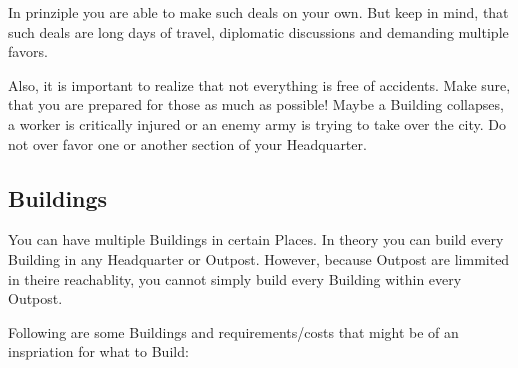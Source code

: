 \documentclass[10pt,twoside,twocolumn,openany]{book}
\begin{document}
In prinziple you are able to make such deals on your own. But keep in mind, that such deals are long days of travel, diplomatic discussions and demanding multiple favors.

Also, it is important to realize that not everything is free of accidents. Make sure, that you are prepared for those as much as possible! Maybe a Building collapses, a worker is critically injured or an enemy army is trying to take over the city. Do not over favor one or another section of your Headquarter.

\subsection{Buildings}

You can have multiple Buildings in certain Places. In theory you can build every Building in any Headquarter or Outpost. However, because Outpost are limmited in theire reachablity, you cannot simply build every Building within every Outpost.

Following are some Buildings and requirements/costs that might be of an inspriation for what to Build:
\end{document}
